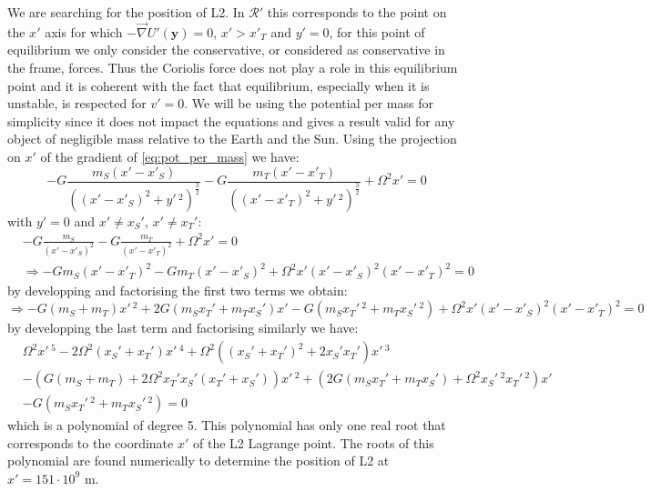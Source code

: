 We are searching for the position of L2. In $\mathcal{R}'$ this corresponds to the point on the $x'$ axis for which $-\vec{\nabla}U'(\mathbf{y}) = 0$, $x' > x'_T$ and $y' = 0$, for this point of equilibrium we only consider the conservative, or considered as conservative in the frame, forces. Thus the Coriolis force does not play a role in this equilibrium point and it is coherent with the fact that equilibrium, especially when it is unstable, is respected for $v'=0$. We will be using the potential per mass for simplicity since it does not impact the equations and gives a result valid for any object of negligible mass relative to the Earth and the Sun. Using the projection on $x'$ of the gradient of \autoref{eq:pot_per_mass} we have:
\begin{equation}
    - G \frac{m_S(x' - x'_S)}{\left((x' - x'_S)^2 + y'\,^2\right)^\frac{3}{2}} - G \frac{m_T(x' - x'_T)}{\left((x' - x'_T)^2 + y'\,^2\right)^\frac{3}{2}} + \Omega^2 x' = 0
\end{equation}
with $y' = 0$ and $x' \neq x_S'$, $x' \neq x_T'$:
\begin{equation}
    \begin{aligned}
        &-G\frac{m_S}{(x'-x'_S)^2} -G\frac{m_T}{(x'-x'_T)^2} + \Omega^2 x' = 0 \\
        & \Rightarrow -Gm_S(x'-x'_T)^2 - Gm_T(x'-x'_S)^2 + \Omega^2 x'(x'-x'_S)^2(x'-x'_T)^2 = 0
    \end{aligned}
\end{equation}
by developping and factorising the first two terms we obtain:
\begin{equation}
    \Rightarrow -G(m_S+m_T)x'\,^2 + 2G(m_Sx_T' + m_Tx_S')x' - G(m_Sx_T'\,^2 + m_Tx_S'\,^2) + \Omega^2 x'(x'-x'_S)^2(x'-x'_T)^2 = 0
\end{equation}
by developping the last term and factorising similarly we have:
\begin{equation}
    \begin{aligned}
            &\Omega^2 x'\,^5 - 2\Omega^2(x_S' + x_T')x'\,^4 + \Omega^2\left((x_S' + x_T')^2 + 2x_S'x_T'\right)x'\,^3 \\
            &- \left(G(m_S+m_T) + 2\Omega^2 x_T'x_S'(x_T' + x_S')\right)x'\,^2 + \left(2G(m_Sx_T' + m_Tx_S') + \Omega^2x_S'\,^2x_T'\,^2\right)x'  \\
            &- G\left(m_Sx_T'\,^2 + m_Tx_S'\,^2\right) = 0
    \end{aligned}
\end{equation}
which is a polynomial of degree 5. This polynomial has only one real root that corresponds to the coordinate $x'$ of the L2 Lagrange point. The roots of this polynomial are found numerically to determine the position of L2 at $x' = 151 \cdot 10^9$ \si{\meter}.